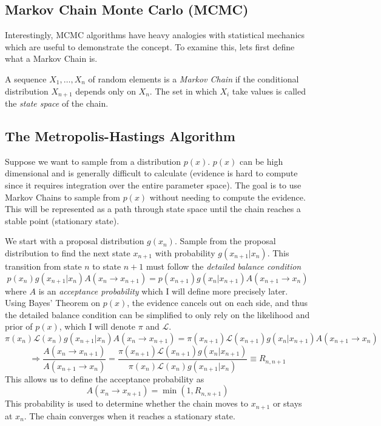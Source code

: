 \subsection{Markov Chain Monte Carlo (MCMC)} 
Interestingly, MCMC algorithms have heavy analogies with statistical mechanics which are useful to demonstrate the concept. To examine this, lets first define what a Markov Chain is.
\begin{defn}
A sequence $X_1,\hdots,X_n$ of random elements is a \textit{Markov Chain} if the conditional distribution $X_{n+1}$ depends only on $X_n$. The set in which $X_i$ take values is called the \textit{state space} of the chain.
\end{defn}


\subsection{The Metropolis-Hastings Algorithm}
Suppose we want to sample from a distribution $p(x)$. $p(x)$ can be high dimensional and is generally difficult to calculate (evidence is hard to compute since it requires integration over the entire parameter space). The goal is to use Markov Chains to sample from $p(x)$ without needing to compute the evidence. This will be represented as a path through state space until the chain reaches a stable point (stationary state).

We start with a proposal distribution $g(x_n)$. Sample from the proposal distribution to find the next state $x_{n+1}$ with probability $g(x_{n+1}|x_n)$. This transition from state $n$ to state $n+1$ must follow the \textit{detailed balance condition}
\[ p(x_n) g(x_{n+1}|x_n) A(x_n \rightarrow x_{n+1}) = p(x_{n+1}) g(x_n|x_{n+1}) A(x_{n+1} \rightarrow x_{n}) \]
where $A$ is an \textit{acceptance probability} which I will define more precisely later. Using Bayes' Theorem on $p(x)$, the evidence cancels out on each side, and thus the detailed balance condition can be simplified to only rely on the likelihood and prior of $p(x)$, which I will denote $\pi$ and $\mathcal{L}$.
\[ \pi(x_n)\mathcal{L}(x_n) g(x_{n+1}|x_n) A(x_n \rightarrow x_{n+1}) = \pi(x_{n+1}) \mathcal{L}(x_{n+1}) g(x_{n}|x_{n+1}) A(x_{n+1}\rightarrow x_{n}) \]
\[ \Rightarrow \frac{A(x_n \rightarrow x_{n+1})}{A(x_{n+1}\rightarrow x_{n})} = \frac{\pi(x_{n+1}) \mathcal{L}(x_{n+1}) g(x_{n}|x_{n+1})}{\pi(x_n)\mathcal{L}(x_n) g(x_{n+1}|x_n)} \equiv R_{n,n+1} \]
This allows us to define the acceptance probability as
\[ A(x_n \rightarrow x_{n+1}) = \min( 1, R_{n,n+1} ) \]
This probability is used to determine whether the chain moves to $x_{n+1}$ or stays at $x_n$. The chain converges when it reaches a stationary state.

